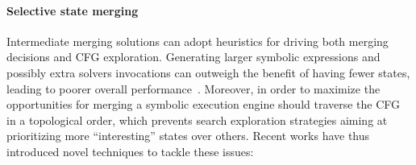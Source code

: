 
\paragraph{Selective state merging} Intermediate merging solutions can adopt heuristics for driving both merging decisions and CFG exploration. Generating larger symbolic expressions and possibly extra solvers invocations can outweigh the benefit of having fewer states, leading to poorer overall performance~\cite{HSS-RV09,KKB-PLDI12}. Moreover, in order to maximize the opportunities for merging a symbolic execution engine should traverse the CFG in a topological order, which prevents search exploration strategies aiming at prioritizing more ``interesting'' states over others. %
Recent works have thus introduced novel techniques to tackle these issues: 
